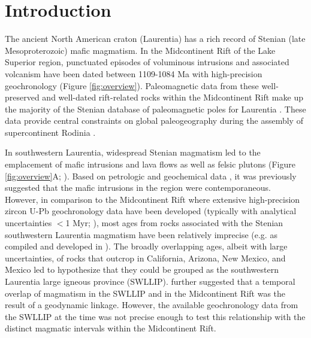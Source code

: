 \section{Introduction}

The ancient North American craton (Laurentia) has a rich record of Stenian (late Mesoproterozoic) mafic magmatism. In the Midcontinent Rift of the Lake Superior region, punctuated episodes of voluminous intrusions and associated volcanism have been dated between 1109-1084 Ma with high-precision geochronology (Figure \ref{fig:overview}). Paleomagnetic data from these well-preserved and well-dated rift-related rocks within the Midcontinent Rift make up the majority of the Stenian database of paleomagnetic poles for Laurentia \cite{Evans2021a}. These data provide central constraints on global paleogeography during the assembly of supercontinent Rodinia \cite{Swanson-Hysell2021c, Evans2021b}. 

In southwestern Laurentia, widespread Stenian magmatism led to the emplacement of mafic intrusions and lava flows as well as felsic plutons (Figure \ref{fig:overview}A; ). Based on petrologic and geochemical data \cite[e.g.][]{Wrucke1966a, Wrucke1972a, Hammond1986a}, it was previously suggested that the mafic intrusions in the region were contemporaneous. However, in comparison to the Midcontinent Rift where extensive high-precision zircon U-Pb geochronology data have been developed (typically with analytical uncertainties $<$1 Myr; ), most ages from rocks associated with the Stenian southwestern Laurentia magmatism have been relatively imprecise (e.g. as compiled and developed in ). The broadly overlapping ages, albeit with large uncertainties, of rocks that outcrop in California, Arizona, New Mexico, and Mexico led  to hypothesize that they could be grouped as the southwestern Laurentia large igneous province (SWLLIP).  further suggested that a temporal overlap of magmatism in the SWLLIP and in the Midcontinent Rift was the result of a geodynamic linkage. However, the available geochronology data from the SWLLIP at the time was not precise enough to test this relationship with the distinct magmatic intervals within the Midcontinent Rift. 

